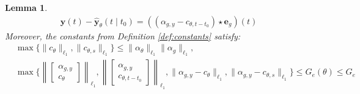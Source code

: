 \documentclass{article}
\def\rvw{{\mathbf{w}}}
\def\rvy{{\mathbf{y}}}
\newtheorem{lemma}[theorem]{Lemma}
\newcommand{\e}{\mathbf{e}}
\newcommand{\y}{\mathbf{y}}
\begin{document}
\begin{lemma}
\begin{equation}
\begin{aligned}
\y(t)-\hat{\rvy}_{\theta}(t \mid t_0) = ((\alpha_{g,y} - c_{\theta,t-t_0}) \star \e_g)(t)
\end{aligned}
\end{equation}
Moreover,  the constants from Definition \ref{def:constants} satisfy:
\begin{align}
& \max\{\|c_{\theta}\|_{\ell_1}, \|c_{\theta,s}\|_{\ell_1}\} \le \|\alpha_{\theta}\|_{\ell_1}\|\alpha_g\|_{\ell_1}, \label{alpha:lemma:eq2a} \\ 
 & \max\{\left\|\begin{bmatrix} \alpha_{g,y} \\ c_{\theta} \end{bmatrix}\right \|_{\ell_1}, \left \|\begin{bmatrix} \alpha_{g,y} \\ c_{\theta,t-t_0} \end{bmatrix}\right\|_{\ell_1}, \|\alpha_{g,y}-c_{\theta}\|_{\ell_1}, \|\alpha_{g,y}-c_{\theta,s}\|_{\ell_1}\} \le G_e(\theta) \le G_e \label{alpha:lemma:eq2b} \\

\end{align}
\end{lemma}
\end{document}
